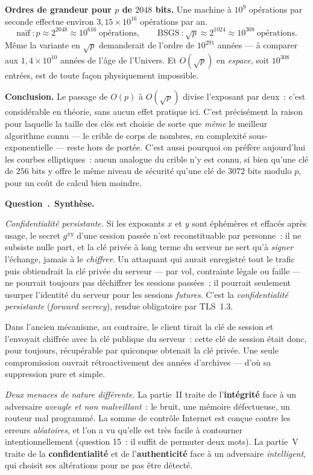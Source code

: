 \documentclass[11pt,a4paper]{article}
\renewcommand{\Q}{\medskip\par\stepcounter{qcnt}\noindent\textbf{\color{cnc}Question~\theqcnt.}~}
\begin{document}
\textbf{Ordres de grandeur pour $p$ de $2048$ bits.} Une machine à $10^{9}$ opérations par
seconde effectue environ $3{,}15\times10^{16}$ opérations par an.
\[ \text{naïf}~: p\approx 2^{2048}\approx 10^{616}\ \text{opérations},\qquad
   \text{BSGS}~: \sqrt{p}\approx 2^{1024}\approx 10^{308}\ \text{opérations}. \]
Même la variante en $\sqrt{p}$ demanderait de l'ordre de $10^{291}$ années — à comparer aux
$1{,}4\times 10^{10}$ années de l'âge de l'Univers. Et $O(\sqrt{p})$ en \emph{espace}, soit
$10^{308}$ entrées, est de toute façon physiquement impossible.

\textbf{Conclusion.} Le passage de $O(p)$ à $O(\sqrt{p})$ divise l'exposant par deux~: c'est
considérable en théorie, sans aucun effet pratique ici. C'est précisément la raison pour
laquelle la taille des clés est choisie de sorte que \emph{même} le meilleur algorithme connu
— le crible de corps de nombres, en complexité sous-exponentielle — reste hors de portée.
C'est aussi pourquoi on préfère aujourd'hui les courbes elliptiques~: aucun analogue du
crible n'y est connu, si bien qu'une clé de $256$ bits y offre le même niveau de sécurité
qu'une clé de $3072$ bits modulo $p$, pour un coût de calcul bien moindre.

\Q \textbf{Synthèse.}

\emph{Confidentialité persistante.} Si les exposants $x$ et $y$ sont éphémères et effacés
après usage, le secret $g^{xy}$ d'une session passée n'est reconstituable par personne~:
il ne subsiste nulle part, et la clé privée à long terme du serveur ne sert qu'à
\emph{signer} l'échange, jamais à le \emph{chiffrer}. Un attaquant qui aurait enregistré tout
le trafic puis obtiendrait la clé privée du serveur — par vol, contrainte légale ou faille —
ne pourrait toujours pas déchiffrer les sessions passées~; il pourrait seulement usurper
l'identité du serveur pour les sessions \emph{futures}. C'est la \emph{confidentialité
persistante} (\emph{forward secrecy}), rendue obligatoire par TLS~1.3.

Dans l'ancien mécanisme, au contraire, le client tirait la clé de session et l'envoyait
chiffrée avec la clé publique du serveur~: cette clé de session était donc, pour toujours,
récupérable par quiconque obtenait la clé privée. Une seule compromission ouvrait
rétroactivement des années d'archives — d'où sa suppression pure et simple.

\emph{Deux menaces de nature différente.} La partie~II traite de l'\textbf{intégrité} face à
un adversaire \emph{aveugle et non malveillant}~: le bruit, une mémoire défectueuse, un
routeur mal programmé. La somme de contrôle Internet est conçue contre les erreurs
\emph{aléatoires}, et l'on a vu qu'elle est très facile à contourner intentionnellement
(question 15~: il suffit de permuter deux mots). La partie~V traite de la
\textbf{confidentialité} et de l'\textbf{authenticité} face à un adversaire
\emph{intelligent}, qui choisit ses altérations pour ne pas être détecté.
\end{document}
